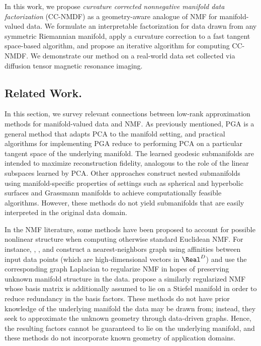 In this work, we propose \emph{curvature corrected nonnegative manifold data factorization} (CC-NMDF) as a geometry-aware analogue of NMF for manifold-valued data. We formulate an interpretable factorization for data drawn from any symmetric Riemannian manifold, apply a curvature correction to a fast tangent space-based algorithm, and propose an iterative algorithm for computing CC-NMDF. We demonstrate our method on a real-world data set collected via diffusion tensor magnetic resonance imaging.

\subsection{Related Work.}
In this section, we survey relevant connections between low-rank approximation methods for manifold-valued data and NMF. As previously mentioned, PGA \citep{fletcher2004principal, fletcher2004principal2} is a general method that adapts PCA to the manifold setting, and practical algorithms for implementing PGA reduce to performing PCA on a particular tangent space of the underlying manifold. The learned geodesic submanifolds are intended to maximize reconstruction fidelity, analogous to the role of the linear subspaces learned by PCA. Other approaches construct nested submanifolds using manifold-specific properties of settings such as spherical and hyperbolic surfaces \citep{jung2012analysis,tabaghi2023principal} and Grassmann manifolds \citep{curry2019principal,yang2021nested} to achieve computationally feasible algorithms. However, these methods do not yield submanifolds that are easily interpreted in the original data domain. 

In the NMF literature, some methods have been proposed to account for possible nonlinear structure when computing otherwise standard Euclidean NMF. For instance, \cite{cai2008non}, \cite{huang2014robust}, and \cite{lu2012manifold} construct a nearest-neighbors graph using affinities between input data points (which are high-dimensional vectors in $\Real^D$) and use the corresponding graph Laplacian to regularize NMF in hopes of preserving unknown manifold structure in the data. \cite{he2020low} propose a similarly regularized NMF whose basis matrix is additionally assumed to lie on a Stiefel manifold in order to reduce redundancy in the basis factors. These methods do not have prior knowledge of the underlying manifold the data may be drawn from; instead, they seek to approximate the unknown  geometry through data-driven graphs. Hence, the resulting factors cannot be guaranteed to lie on the underlying manifold, and these methods do not incorporate known geometry of application domains. 

